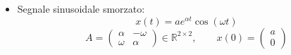 \begin{itemize}
\begin{equation*}
		\end{equation*}
	\item Segnale sinusoidale smorzato:
	\begin{equation*}
	x(t)=ae^{\alpha t}\cos(\omega t)
	\end{equation*}
	\begin{equation*}
	A=\begin{pmatrix}\alpha & -\omega\\ \omega & \alpha\end{pmatrix} \in \mathbb{R}^{2 \times 2}, \qquad x(0)=\begin{pmatrix}a \\ 0\end{pmatrix}
	\end{equation*}
\end{itemize}

\newpage